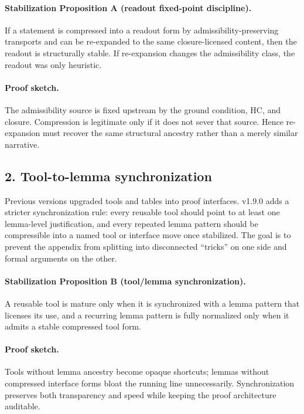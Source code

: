 \paragraph{Stabilization Proposition A (readout fixed-point discipline).}
If a statement is compressed into a readout form by admissibility-preserving
transports and can be re-expanded to the same closure-licensed content, then the
readout is structurally stable. If re-expansion changes the admissibility class,
the readout was only heuristic.

\paragraph{Proof sketch.}
The admissibility source is fixed upstream by the ground condition, HC, and
closure. Compression is legitimate only if it does not sever that source. Hence
re-expansion must recover the same structural ancestry rather than a merely
similar narrative.

\subsection*{2. Tool-to-lemma synchronization}
Previous versions upgraded tools and tables into proof interfaces. v1.9.0
adds a stricter synchronization rule: every reusable tool should point to at
least one lemma-level justification, and every repeated lemma pattern should be
compressible into a named tool or interface move once stabilized. The goal is to
prevent the appendix from splitting into disconnected ``tricks'' on one side and
formal arguments on the other.

\paragraph{Stabilization Proposition B (tool/lemma synchronization).}
A reusable tool is mature only when it is synchronized with a lemma pattern that
licenses its use, and a recurring lemma pattern is fully normalized only when it
admits a stable compressed tool form.

\paragraph{Proof sketch.}
Tools without lemma ancestry become opaque shortcuts; lemmas without compressed
interface forms bloat the running line unnecessarily. Synchronization preserves
both transparency and speed while keeping the proof architecture auditable.

